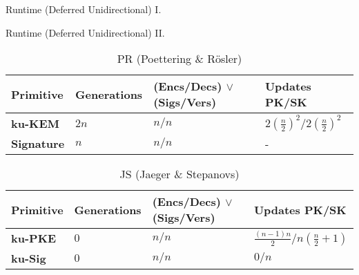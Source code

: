 \documentclass{beamer}
\begin{document}
\begin{frame}{Runtime (Deferred Unidirectional) I.}
 \begin{figure}[H]
    \centering
     
  \end{figure}
\end{frame}

\begin{frame}{Runtime (Deferred Unidirectional) II.}
  \scriptsize
  \begin{table}
    \caption*{PR (Poettering \& Rösler)}
    \begin{tabular}{ | l | l | l | l |}
    \hline
    Primitive & Generations & (Encs/Decs) $\vee$ (Sigs/Vers) & Updates PK/SK \\ \hline
    \textbf{ku-KEM} & $2n$ & $n/n$ & $2(\frac{n}{2})^2/2(\frac{n}{2})^2$ \\ \hline
    \textbf{Signature} & $n$ & $n/n$ & - \\  
    \hline
    \end{tabular}
  \end{table}
  \begin{table}
    \caption*{JS (Jaeger \& Stepanovs)}
    \begin{tabular}{ | l | l | l | l |}
    \hline
    Primitive & Generations & (Encs/Decs) $\vee$ (Sigs/Vers) & Updates PK/SK \\ \hline
    \textbf{ku-PKE} & $0$ & $n/n$ & $\frac{(n-1)n}{2}/n(\frac{n}{2}+1)$ \\ \hline
    \textbf{ku-Sig} & $0$ & $n/n$ & $0/n$ \\  
    \hline
    \end{tabular}
  \end{table}
\end{frame}
\end{document}
